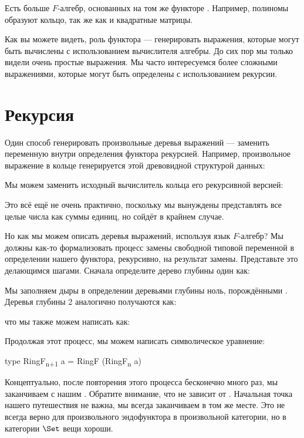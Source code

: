Есть больше $F$-алгебр, основанных на том же функторе . Например,
полиномы образуют кольцо, так же как и квадратные матрицы.

Как вы можете видеть, роль функтора --- генерировать выражения, которые
могут быть вычислены с использованием вычислителя алгебры. До сих пор мы только
видели очень простые выражения. Мы часто интересуемся более сложными
выражениями, которые могут быть определены с использованием рекурсии.

\section{Рекурсия}

Один способ генерировать произвольные деревья выражений --- заменить
переменную  внутри определения функтора рекурсией. Например,
произвольное выражение в кольце генерируется этой
древовидной структурой данных:

Мы можем заменить исходный вычислитель кольца его рекурсивной версией:

Это всё ещё не очень практично, поскольку мы вынуждены представлять все
целые числа как суммы единиц, но сойдёт в крайнем случае.

Но как мы можем описать деревья выражений, используя язык
$F$-алгебр? Мы должны как-то формализовать процесс замены свободной
типовой переменной в определении нашего функтора, рекурсивно, на
результат замены. Представьте это делающимся шагами. Сначала
определите дерево глубины один как:

Мы заполняем дыры в определении 
деревьями глубины ноль, порождёнными . Деревья глубины 2
аналогично получаются как:

что мы также можем написать как:

Продолжая этот процесс, мы можем написать символическое уравнение:

\begin{snipv}
type RingF\textsubscript{n+1} a = RingF (RingF\textsubscript{n} a)
\end{snipv}
Концептуально, после повторения этого процесса бесконечно много раз, мы заканчиваем
с нашим . Обратите внимание, что  не зависит от
. Начальная точка нашего путешествия не важна, мы всегда
заканчиваем в том же месте. Это не всегда верно для произвольного
эндофунктора в произвольной категории, но в категории $\Set$
вещи хороши.


